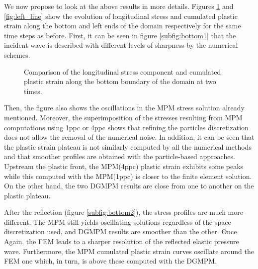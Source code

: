 We now propose to look at the above results in more details.
Figures \ref{fig:bottom_line} and \ref{fig:left_line} show the evolution of longitudinal stress and cumulated plastic strain along the bottom and left ends of the domain respectively for the same time steps as before.
First, it can be seen in figure \ref{subfig:bottom1} that the incident wave is described with different levels of sharpness by the numerical schemes.
\begin{figure}[h!]
  \centering
  {}
  {}
  
  \caption{Comparison of the longitudinal stress component and cumulated plastic strain along the bottom boundary of the domain at two times.}
  \label{fig:bottom_line}
\end{figure}
Then, the figure also shows the oscillations in the MPM stress solution already mentioned.
Moreover, the superimposition of the stresses resulting from MPM computations using 1ppc or 4ppc shows that refining the particles discretization does not allow the removal of the numerical noise.
In addition, it can be seen that the plastic strain plateau is not similarly computed by all the numerical methods and that smoother profiles are obtained with the particle-based approaches. 
Upstream the plastic front, the MPM(4ppc) plastic strain exhibits some peaks while this computed with the MPM(1ppc) is closer to the finite element solution.
On the other hand, the two DGMPM results are close from one to another on the plastic plateau.

After the reflection (figure \ref{subfig:bottom2}), the stress profiles are much more different. 
The MPM still yields oscillating solutions regardless of the space discretization used, and DGMPM results are smoother than the other.
Once Again, the FEM leads to a sharper resolution of the reflected elastic pressure wave.
Furthermore, the MPM cumulated plastic strain curves oscillate around the FEM one which, in turn, is above these computed with the DGMPM.

